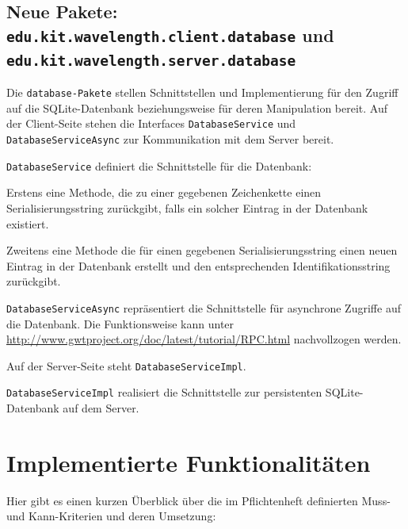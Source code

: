 \documentclass[parskip=full,11pt,twoside]{scrartcl}
\begin{document}
 
\subsection[Hinzugefügte Pakete]{Neue Pakete: \texttt{edu.kit.wavelength.client.database} und \texttt{edu.kit.wavelength.server.database}}

Die \texttt{database-Pakete} stellen Schnittstellen und Implementierung für den Zugriff auf die SQLite-Datenbank beziehungsweise für deren Manipulation bereit.
Auf der Client-Seite stehen die Interfaces \texttt{DatabaseService} und \texttt{DatabaseServiceAsync} zur Kommunikation mit dem Server bereit.

\texttt{DatabaseService} definiert die Schnittstelle für die Datenbank: 

Erstens eine Methode, die zu einer gegebenen Zeichenkette einen Serialisierungsstring zurückgibt,
falls ein solcher Eintrag in der Datenbank existiert. 

Zweitens eine Methode die für einen gegebenen Serialisierungsstring einen neuen Eintrag in der Datenbank erstellt und den entsprechenden Identifikationsstring zurückgibt.

\texttt{DatabaseServiceAsync} repräsentiert die Schnittstelle für asynchrone Zugriffe auf die Datenbank.
Die Funktionsweise kann unter \href{http://www.gwtproject.org/doc/latest/tutorial/RPC.html}{http://www.gwtproject.org/doc/latest/tutorial/RPC.html} nachvollzogen werden.

Auf der Server-Seite steht \texttt{DatabaseServiceImpl}.

\texttt{DatabaseServiceImpl} realisiert die Schnittstelle zur persistenten SQLite-Datenbank auf dem Server.

\newpage
\section{Implementierte Funktionalitäten}
Hier gibt es einen kurzen Überblick über die im Pflichtenheft definierten Muss- und Kann-Kriterien und deren Umsetzung:
\end{document}
